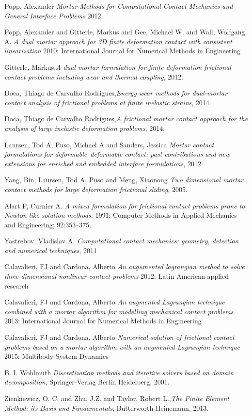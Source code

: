\documentclass[a4paper,10pt]{article} %
\begin{document}
\begin{thebibliography}{99}

 Popp, Alexander {\em Mortar Methods for Computational Contact Mechanics and General Interface Problems}  2012.

  Popp, Alexander and Gitterle, Markus and Gee, Michael W. and Wall, Wolfgang A. {\em A dual mortar approach for 3D finite deformation contact with consistent linearization} 2010: International Journal for Numerical Methods in Engineering

 Gitterle, Markus,{\em A dual mortar formulation for finite deformation frictional contact problems including wear and thermal coupling}, 2012.

 Doca, Thiago de Carvalho Rodrigues,{\em Energy wear methods for dual-mortar contact analysis of frictional problems at finite inelastic strains}, 2014.

 Doca, Thiago de Carvalho Rodrigues,{\em A frictional mortar contact approach for the analysis of large inelastic deformation problems}, 2014.

 Laursen, Tod A, Puso, Michael A and Sanders, Jessica {\em Mortar contact formulations for deformable–deformable contact: past contributions and new extensions for enriched and embedded interface formulations}, 2012.

 Yang, Bin, Laursen, Tod A, Puso and Meng, Xiaonong {\em Two dimensional mortar contact methods for large deformation frictional sliding}, 2005.

   Alart P, Curnier A.  {\em A mixed formulation for frictional contact problems prone to Newton like solution methods.} 1991: Computer Methods in Applied Mechanics and Engineering; 92:353–375.

 Yastrebov, Vladislav A. {\em Computational contact mechanics: geometry, detection and numerical techniques}, 2011

  Calavalieri, FJ and Cardona, Alberto {\em An augumented lagrangian method to solve three-dimensional nonlinear contact problems} 2012: Latin American applied research

  Calavalieri, FJ and Cardona, Alberto {\em An augmented Lagrangian technique combined with a mortar algorithm for modelling mechanical contact problems} 2013: International Journal for Numerical Methods in Engineering

  Calavalieri, FJ and Cardona, Alberto {\em Numerical solution of frictional contact problems based on a mortar algorithm with an augmented Lagrangian technique} 2015: Multibody System Dynamics

 B. I. Wohlmuth,{\em Discretization methods and iterative solvers based on domain decomposition}, Springer-Verlag Berlin Heidelberg, 2001.

 Zienkiewicz, O. C. and Zhu, J.Z. and Taylor, Robert L.,{\em The Finite Element Method: its Basis and Fundamentals}, Butterworth-Heinemann, 2013.

\end{thebibliography}
\end{document}
